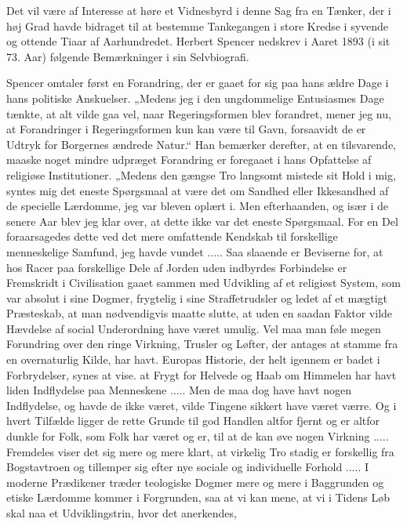 \documentclass[12pt,a4paper,openany]{book}
\newcommand{\opage}[1]{\marginnote{\footnotesize\textit{[#1]}}}
\begin{document}
Det vil være af Interesse at høre et Vidnesbyrd i denne Sag fra
en Tænker, der i høj Grad havde bidraget til at bestemme Tankegangen
i store Kredse i syvende og ottende Tiaar af Aarhundredet.
Herbert Spencer nedskrev i Aaret 1893 (i sit 73. Aar) følgende Bemærkninger
i sin Selvbiografi.

Spencer omtaler først en Forandring, der er gaaet for sig paa hans
ældre Dage i hans politiske Anskuelser. „Medens jeg i den ungdommelige
Entusiasmes Dage tænkte, at alt vilde gaa vel, naar Regeringsformen
blev forandret, mener jeg nu, at Forandringer i Regeringsformen
kun kan være til Gavn, forsaavidt de er Udtryk for Borgernes
ændrede Natur.“ Han bemærker derefter, at en tilsvarende, maaske
noget mindre udpræget Forandring er foregaaet i hans Opfattelse
af religiøse Institutioner. „Medens den gængse Tro langsomt mistede
sit Hold i mig, syntes mig det eneste Spørgsmaal at være det om
Sandhed eller Ikkesandhed af de specielle Lærdomme, jeg var bleven
oplært i. Men efterhaanden, og især i de senere Aar blev jeg
klar over, at dette ikke var det eneste Spørgsmaal. For en Del foraarsagedes
dette ved det mere omfattende Kendskab til forskellige
menneskelige Samfund, jeg havde vundet ..... Saa slaaende er Beviserne
for, at hos Racer paa forskellige Dele af Jorden uden indbyrdes
Forbindelse er Fremskridt i Civilisation gaaet sammen med
Udvikling af et religiøst System, som var absolut i sine Dogmer,
frygtelig i sine Straffetrudsler og ledet af et mægtigt Præsteskab, at
man nødvendigvis maatte slutte, at uden en saadan Faktor vilde
Hævdelse af social Underordning have været umulig. Vel maa man
føle megen Forundring over den ringe Virkning, Trusler og Løfter,
der antages at stamme fra en overnaturlig Kilde, har havt. Europas
Historie, der helt igennem er badet i Forbrydelser, synes at vise.
\opage{150}at Frygt for Helvede og Haab om Himmelen har havt liden Indflydelse
paa Menneskene ..... Men de maa dog have havt nogen Indflydelse, og havde de ikke været, vilde Tingene sikkert have været
værre. Og i hvert Tilfælde ligger de rette Grunde til god Handlen
altfor fjernt og er altfor dunkle for Folk, som Folk har været og er,
til at de kan øve nogen Virkning ..... Fremdeles viser det sig mere
og mere klart, at virkelig Tro stadig er forskellig fra Bogstavtroen
og tillemper sig efter nye sociale og individuelle Forhold ..... I moderne
Prædikener træder teologiske Dogmer mere og mere i Baggrunden
og etiske Lærdomme kommer i Forgrunden, saa at vi kan
mene, at vi i Tidens Løb skal naa et Udviklingstrin, hvor det anerkendes,
\end{document}
